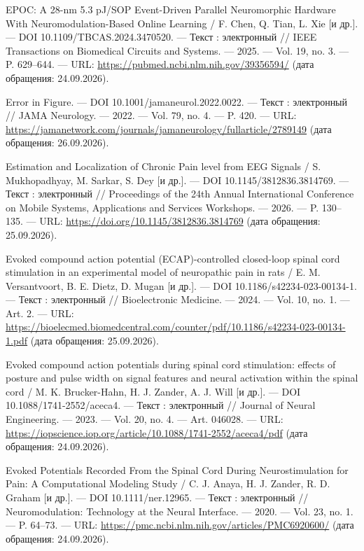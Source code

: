 \begin{list}{}{\setlength{\leftmargin}{10mm}\setlength{\labelwidth}{8mm}\setlength{\labelsep}{2mm}\setlength{\itemsep}{0pt}\setlength{\parsep}{0pt}\setlength{\topsep}{0pt}}
\item[117.] EPOC: A 28-nm 5.3 pJ/SOP Event-Driven Parallel Neuromorphic Hardware With Neuromodulation-Based Online Learning / F. Chen, Q. Tian, L. Xie [и др.]. — DOI 10.1109/TBCAS.2024.3470520. — Текст : электронный // IEEE Transactions on Biomedical Circuits and Systems. — 2025. — Vol. 19, no. 3. — P. 629–644. — URL: \url{https://pubmed.ncbi.nlm.nih.gov/39356594/} (дата обращения: 24.09.2026).
\item[118.] Error in Figure. — DOI 10.1001/jamaneurol.2022.0022. — Текст : электронный // JAMA Neurology. — 2022. — Vol. 79, no. 4. — P. 420. — URL: \url{https://jamanetwork.com/journals/jamaneurology/fullarticle/2789149} (дата обращения: 26.09.2026).
\item[119.] Estimation and Localization of Chronic Pain level from EEG Signals / S. Mukhopadhyay, M. Sarkar, S. Dey [и др.]. — DOI 10.1145/3812836.3814769. — Текст : электронный // Proceedings of the 24th Annual International Conference on Mobile Systems, Applications and Services Workshops. — 2026. — P. 130–135. — URL: \url{https://doi.org/10.1145/3812836.3814769} (дата обращения: 25.09.2026).
\item[120.] Evoked compound action potential (ECAP)-controlled closed-loop spinal cord stimulation in an experimental model of neuropathic pain in rats / E. M. Versantvoort, B. E. Dietz, D. Mugan [и др.]. — DOI 10.1186/s42234-023-00134-1. — Текст : электронный // Bioelectronic Medicine. — 2024. — Vol. 10, no. 1. — Art. 2. — URL: \url{https://bioelecmed.biomedcentral.com/counter/pdf/10.1186/s42234-023-00134-1.pdf} (дата обращения: 25.09.2026).
\item[121.] Evoked compound action potentials during spinal cord stimulation: effects of posture and pulse width on signal features and neural activation within the spinal cord / M. K. Brucker-Hahn, H. J. Zander, A. J. Will [и др.]. — DOI 10.1088/1741-2552/aceca4. — Текст : электронный // Journal of Neural Engineering. — 2023. — Vol. 20, no. 4. — Art. 046028. — URL: \url{https://iopscience.iop.org/article/10.1088/1741-2552/aceca4/pdf} (дата обращения: 24.09.2026).
\item[122.] Evoked Potentials Recorded From the Spinal Cord During Neurostimulation for Pain: A Computational Modeling Study / C. J. Anaya, H. J. Zander, R. D. Graham [и др.]. — DOI 10.1111/ner.12965. — Текст : электронный // Neuromodulation: Technology at the Neural Interface. — 2020. — Vol. 23, no. 1. — P. 64–73. — URL: \url{https://pmc.ncbi.nlm.nih.gov/articles/PMC6920600/} (дата обращения: 24.09.2026).

\end{list}

